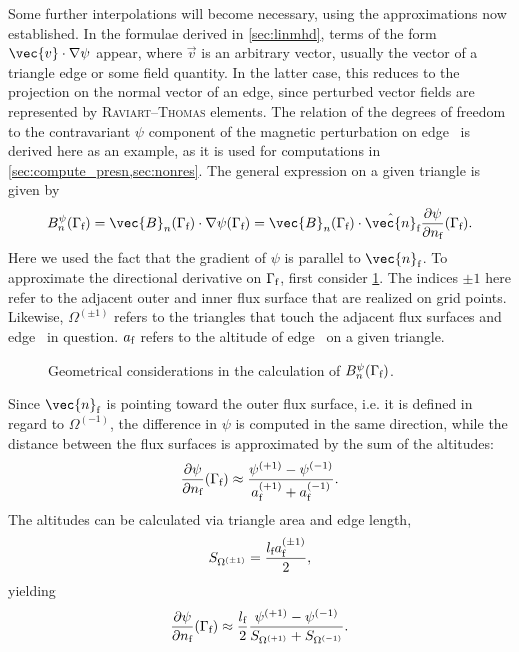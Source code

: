 Some further interpolations will become necessary, using the approximations now established. In the formulae derived in \cref{sec:linmhd}, terms of the form $\vec{v} \cdot \grad \psi$ appear, where $\vec{v}$ is an arbitrary vector, usually the vector of a triangle edge or some field quantity. In the latter case, this reduces to the projection on the normal vector of an edge, since perturbed vector fields are represented by \textsc{Raviart}--\textsc{Thomas} elements. The relation of the degrees of freedom to the contravariant $\psi$ component of the magnetic perturbation on edge \fs\ is derived here as an example, as it is used for computations in \cref{sec:compute_presn,sec:nonres}. The general expression on a given triangle is given by
\begin{gather}
  B_{n}^{\psi} (\Gamma_{\fs}) = \vec{B}_{n} (\Gamma_{\fs}) \cdot \grad \psi (\Gamma_{\fs}) = \vec{B}_{n} (\Gamma_{\fs}) \cdot \hat{\vec{n}}_{\fs} \pd[\psi]{n_{\fs}} (\Gamma_{\fs}).
\end{gather}
Here we used the fact that the gradient of $\psi$ is parallel to $\vec{n}_{\fs}$. To approximate the directional derivative on $\Gamma_{\fs}$, first consider \cref{fig:altitudes}. The indices $\pm 1$ here refer to the adjacent outer and inner flux surface that are realized on grid points. Likewise, $\Omega^{(\pm 1)}$ refers to the triangles that touch the adjacent flux surfaces and edge \fs\ in question. $a_{\fs}$ refers to the altitude of edge \fs\ on a given triangle.
\begin{figure}[bth]
  \centering
  
  \caption{Geometrical considerations in the calculation of $B_{n}^{\psi} (\Gamma_{\fs})$.}
  \label{fig:altitudes}
\end{figure}
Since $\vec{n}_{\fs}$ is pointing toward the outer flux surface, i.e. it is defined in regard to $\Omega^{(-1)}$, the difference in $\psi$ is computed in the same direction, while the distance between the flux surfaces is approximated by the sum of the altitudes:
\begin{gather}
  \pd[\psi]{n_{\fs}} (\Gamma_{\fs}) \approx \frac{\psi^{(+1)} - \psi^{(-1)}}{a_{\fs}^{(+1)} + a_{\fs}^{(-1)}}.
\end{gather}
The altitudes can be calculated via triangle area and edge length,
\begin{gather}
  S_{\Omega^{(\pm 1)}} = \frac{l_{\fs} a_{\fs}^{(\pm 1)}}{2},
\end{gather}
yielding
\begin{gather}
  \pd[\psi]{n_{\fs}} (\Gamma_{\fs}) \approx \frac{l_{\fs}}{2} \frac{\psi^{(+1)} - \psi^{(-1)}}{S_{\Omega^{(+1)}} + S_{\Omega^{(-1)}}}.
\end{gather}

